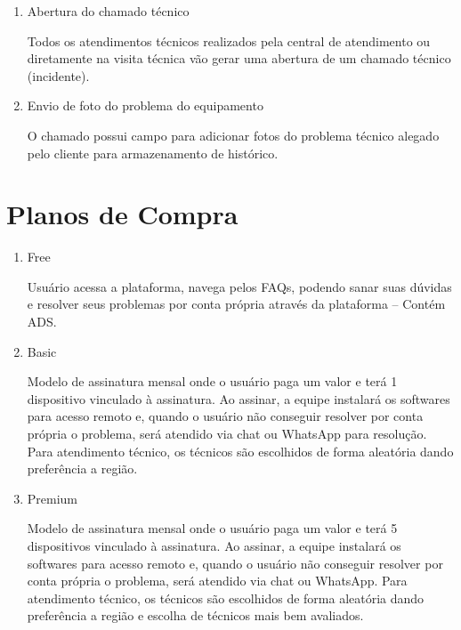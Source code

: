 \documentclass[
    12pt,               %
    openright,          %
    oneside,
    a4paper,            %
    MODELO,             %
    english,            %
    brazil              %
   ]{ifsp-spo-inf-ctds}
\begin{document}
	\begin{enumerate}
		
		\item
		Abertura do chamado técnico
		
		Todos os atendimentos técnicos realizados pela central de atendimento ou diretamente na visita técnica vão gerar uma abertura de um chamado técnico (incidente).
		
		\item
		Envio de foto do problema do equipamento
		
		O chamado possui campo para adicionar fotos do problema técnico alegado pelo cliente para armazenamento de histórico.
		
	\end{enumerate}

\section{Planos de Compra}

	\begin{enumerate}
		
		\item
		Free
		
		Usuário acessa a plataforma, navega pelos FAQs, podendo sanar suas dúvidas e resolver seus problemas por conta própria através da plataforma – Contém ADS.
		
		\item
		Basic
		
		Modelo de assinatura mensal onde o usuário paga um valor e terá 1 dispositivo vinculado à assinatura. Ao assinar, a equipe instalará os softwares para acesso remoto e, quando o usuário não conseguir resolver por conta própria o problema, será atendido via chat ou WhatsApp para resolução. Para atendimento técnico, os técnicos são escolhidos de forma aleatória dando preferência a região.
		
		\item
		Premium
		
		Modelo de assinatura mensal onde o usuário paga um valor e terá 5 dispositivos vinculado à assinatura. Ao assinar, a equipe instalará os softwares para acesso remoto e, quando o usuário não conseguir resolver por conta própria o problema, será atendido via chat ou WhatsApp. Para atendimento técnico, os técnicos são escolhidos de forma aleatória dando preferência a região e escolha de técnicos mais bem avaliados.
		
	\end{enumerate}
\end{document}
